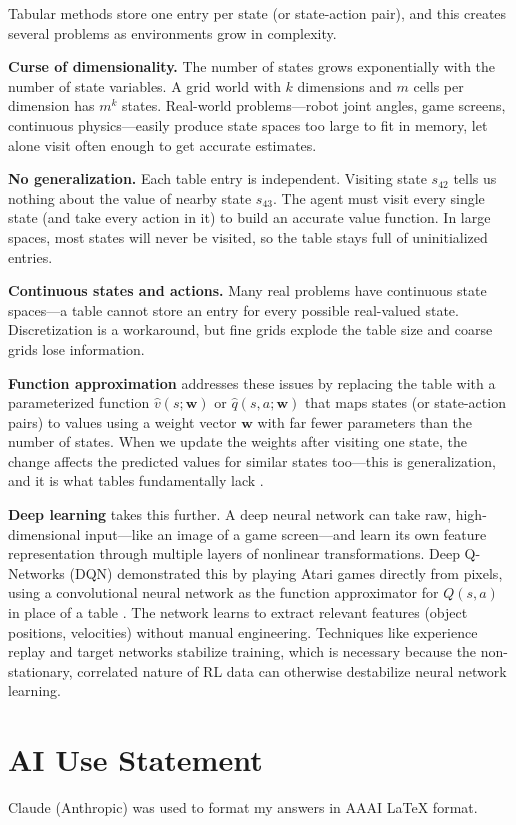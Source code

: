 \documentclass[letterpaper]{article}
\begin{document}
\vspace{0.5em}

Tabular methods store one entry per state (or state-action pair), and this creates several problems as environments grow in complexity.

\textbf{Curse of dimensionality.} The number of states grows exponentially with the number of state variables. A grid world with $k$ dimensions and $m$ cells per dimension has $m^k$ states. Real-world problems---robot joint angles, game screens, continuous physics---easily produce state spaces too large to fit in memory, let alone visit often enough to get accurate estimates.

\textbf{No generalization.} Each table entry is independent. Visiting state $s_{42}$ tells us nothing about the value of nearby state $s_{43}$. The agent must visit every single state (and take every action in it) to build an accurate value function. In large spaces, most states will never be visited, so the table stays full of uninitialized entries.

\textbf{Continuous states and actions.} Many real problems have continuous state spaces---a table cannot store an entry for every possible real-valued state. Discretization is a workaround, but fine grids explode the table size and coarse grids lose information.

\textbf{Function approximation} addresses these issues by replacing the table with a parameterized function $\hat{v}(s; \mathbf{w})$ or $\hat{q}(s, a; \mathbf{w})$ that maps states (or state-action pairs) to values using a weight vector $\mathbf{w}$ with far fewer parameters than the number of states. When we update the weights after visiting one state, the change affects the predicted values for similar states too---this is generalization, and it is what tables fundamentally lack \citep{sutton2018reinforcement}.

\textbf{Deep learning} takes this further. A deep neural network can take raw, high-dimensional input---like an image of a game screen---and learn its own feature representation through multiple layers of nonlinear transformations. Deep Q-Networks (DQN) demonstrated this by playing Atari games directly from pixels, using a convolutional neural network as the function approximator for $Q(s,a)$ in place of a table \citep{mnih2015human}. The network learns to extract relevant features (object positions, velocities) without manual engineering. Techniques like experience replay and target networks stabilize training, which is necessary because the non-stationary, correlated nature of RL data can otherwise destabilize neural network learning.

\section*{AI Use Statement}

Claude (Anthropic) was used to format my answers in AAAI LaTeX format.


\end{document}
